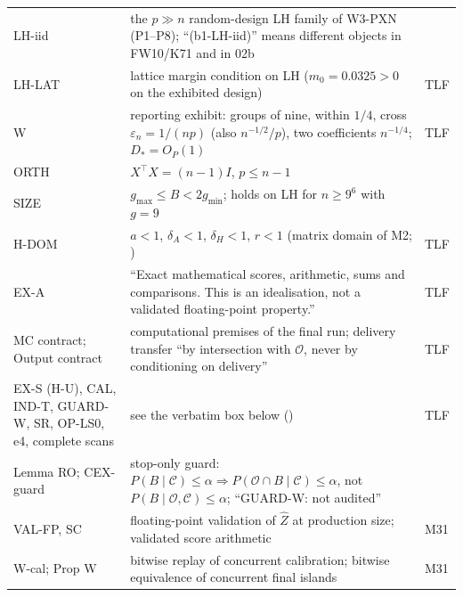 {\begin{xltabular}{\linewidth}{@{}>{\raggedright\arraybackslash}p{2.3cm}>{\raggedright\arraybackslash}X>{\raggedright\arraybackslash}p{4.6cm}@{}}
LH-iid & the $p\gg n$ random-design LH family of W3-PXN (P1–P8); ``(b1-LH-iid)'' means different objects in FW10/K71 and in 02b &  \\
LH-LAT & lattice margin condition on LH ($m_0=0.0325>0$ on the exhibited design) & TLF \\
W & reporting exhibit: groups of nine, within $1/4$, cross $\varepsilon_n=1/(np)$ (also $n^{-1/2}/p$), two coefficients $n^{-1/4}$; $D_*=O_P(1)$ & TLF \\
ORTH & $X^\top X=(n-1)I$, $p\le n-1$ & \\
SIZE & $g_{\max}\le B<2g_{\min}$; holds on LH for $n\ge9^6$ with $g=9$ & \\
H-DOM & $a<1$, $\delta_A<1$, $\delta_H<1$, $r<1$ (matrix domain of M2; ) & TLF \\
EX-A & ``Exact mathematical scores, arithmetic, sums and comparisons. This is an idealisation, not a validated floating-point property.'' & TLF \\
MC contract; Output contract & computational premises of the final run; delivery transfer ``by intersection with $\mathcal O$, never by conditioning on delivery'' & TLF \\
EX-S (H-U), CAL, IND-T, GUARD-W, SR, OP-LS0, e4, complete scans & see the verbatim box below () & TLF \\
Lemma RO; CEX-guard & stop-only guard: $P(B\mid\mathcal C)\le\alpha\Rightarrow P(\mathcal O\cap B\mid\mathcal C)\le\alpha$, not $P(B\mid\mathcal O,\mathcal C)\le\alpha$; ``GUARD-W: not audited'' & \\
VAL-FP, SC & floating-point validation of $\hat Z$ at production size; validated score arithmetic & M31  \\
W-cal; Prop W & bitwise replay of concurrent calibration; bitwise equivalence of concurrent final islands & M31  \\

\end{xltabular}}
